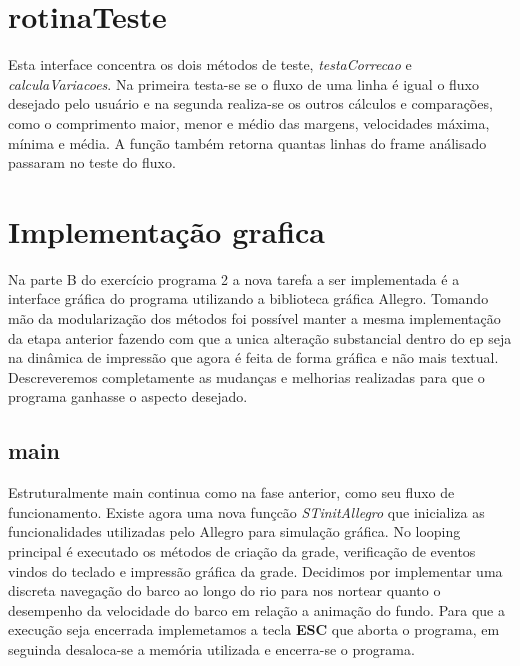 \documentclass[a4paper,11pt]{article}
\begin{document}
\section{rotinaTeste}
Esta interface concentra os dois métodos de teste, \textit{testaCorrecao} e \textit{calculaVariacoes}. Na primeira testa-se se o fluxo de uma linha é igual o fluxo desejado pelo usuário e na segunda realiza-se os outros cálculos e compara\c{c}ões, como o comprimento maior, menor e médio das margens, velocidades máxima, mínima e média. A fun\c{c}ão também retorna quantas linhas do frame análisado passaram no teste do fluxo.

\section{Implementa\c{c}ão grafica}
Na parte B do exercício programa 2 a nova tarefa a ser implementada é a interface gráfica do programa utilizando a biblioteca gráfica Allegro. Tomando mão da modularização dos métodos foi possível manter a mesma implementação da etapa anterior fazendo com que a unica alteração substancial dentro do ep seja na dinâmica de impressão que agora é feita de forma gráfica e não mais textual. Descreveremos completamente as mudanças e melhorias realizadas para que o programa ganhasse o aspecto desejado.

\subsection{main}
Estruturalmente main continua como na fase anterior, como seu fluxo de funcionamento. Existe agora uma nova funçcão \textit{STinitAllegro} que inicializa as funcionalidades utilizadas pelo Allegro para simulação gráfica. No looping principal é executado os métodos de criação da grade, verificação de eventos vindos do teclado e impressão gráfica da grade. Decidimos por implementar uma discreta navegação do barco ao longo do rio para nos nortear quanto o desempenho da velocidade do barco em relação a animação do fundo. Para que a execução seja encerrada implemetamos a tecla \textbf{ESC} que aborta o programa, em seguinda desaloca-se a memória utilizada e encerra-se o programa.
\end{document}
